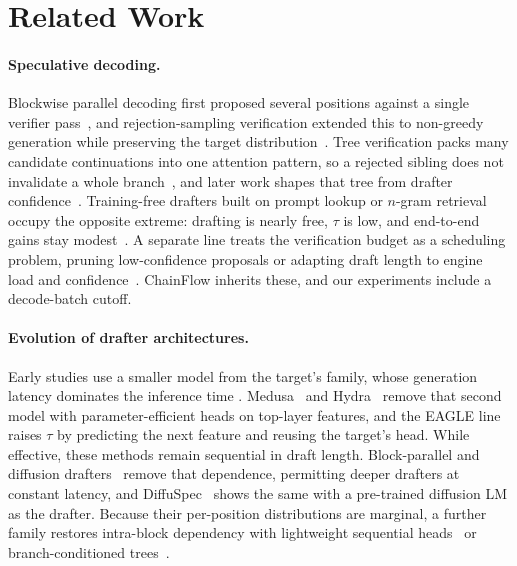 \documentclass{article}
\newcommand{\Sys}{ChainFlow\xspace}
\begin{document}
\section{Related Work}

\paragraph{Speculative decoding.} Blockwise parallel decoding first proposed several positions against a single verifier pass~\citep{stern2018blockwise}, and rejection-sampling verification extended this to non-greedy generation while preserving the target distribution~\citep{leviathan2023speculative,chen2023accelerating}. Tree verification packs many candidate continuations into one attention pattern, so a rejected sibling does not invalidate a whole branch~\citep{miao2024specinfer}, and later work shapes that tree from drafter confidence~\citep{li2024eagle2}. Training-free drafters built on prompt lookup or $n$-gram retrieval occupy the opposite extreme: drafting is nearly free, $\tau$ is low, and end-to-end gains stay modest~\citep{saxena2023pld,fu2024lookahead}. A separate line treats the verification budget as a scheduling problem, pruning low-confidence proposals or adapting draft length to engine load and confidence~\citep{cheng2026dspark,sadhukhan2025magicdec}. \Sys inherits these, and our experiments include a decode-batch cutoff.

\paragraph{Evolution of drafter architectures.}
Early studies use a smaller model from the target's family, whose generation latency dominates the inference time \citep{leviathan2023speculative,chen2023accelerating}. Medusa~\citep{cai2024medusa} and Hydra~\citep{ankner2024hydra} remove that second model with parameter-efficient heads on top-layer features, and the EAGLE line~\citep{li2024eagle,li2025eagle3} raises $\tau$ by predicting the next feature and reusing the target's head. While effective, these methods remain sequential in draft length. Block-parallel and diffusion drafters~\citep{an2025pard,chen2026dflash, liu2026dart} remove that dependence, permitting deeper drafters at constant latency, and DiffuSpec~\citep{li2025diffuspec} shows the same with a pre-trained diffusion LM as the drafter. Because their per-position distributions are marginal, a further family restores intra-block dependency with lightweight sequential heads~\citep{cheng2026dspark,huang2026domino} or branch-conditioned trees~\citep{hu2026jetspec,ringel2026ddtree}.
\end{document}
